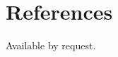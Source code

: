 \documentclass[12pt]{article} %
\begin{document}

\section*{References}
\vspace{1ex}

Available by request.


%
%
\end{document}
